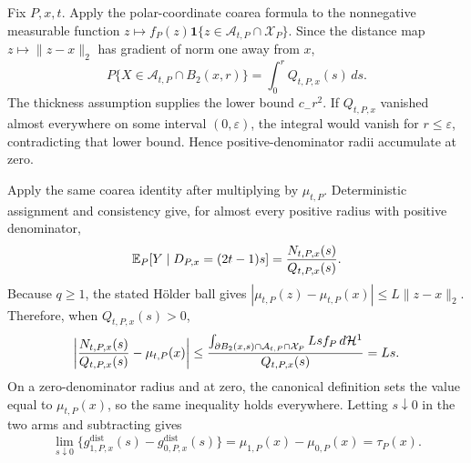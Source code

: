 Fix \(P,x,t\).  Apply the polar-coordinate coarea formula to the nonnegative measurable function
\(z\mapsto f_P(z)\mathbf1\{z\in\mathcal A_{t,P}\cap\mathcal X_P\}\).  Since the distance map \(z\mapsto\|z-x\|_2\) has gradient of norm one away from \(x\),
\[
 P\{X\in\mathcal A_{t,P}\cap B_2(x,r)\}=\int_0^rQ_{t,P,x}(s)\,ds.
\]
The thickness assumption supplies the lower bound \(c_-r^2\).  If \(Q_{t,P,x}\) vanished almost everywhere on some interval \((0,\varepsilon)\), the integral would vanish for \(r\leq\varepsilon\), contradicting that lower bound.  Hence positive-denominator radii accumulate at zero.

Apply the same coarea identity after multiplying by \(\mu_{t,P}\).  Deterministic assignment and consistency give, for almost every positive radius with positive denominator,
\[
 \mathbb E_P[Y\mid D_{P,x}=(2t-1)s]
 ={N_{t,P,x}(s)\over Q_{t,P,x}(s)}.
\]
Because \(q\geq1\), the stated H\"older ball gives \(|\mu_{t,P}(z)-\mu_{t,P}(x)|\leq L\|z-x\|_2\).  Therefore, when \(Q_{t,P,x}(s)>0\),
\[
 \left|{N_{t,P,x}(s)\over Q_{t,P,x}(s)}-\mu_{t,P}(x)\right|
 \leq {\int_{\partial B_2(x,s)\cap\mathcal A_{t,P}\cap\mathcal X_P}Ls f_P\,d\mathcal H^1\over Q_{t,P,x}(s)}=Ls.
\]
On a zero-denominator radius and at zero, the canonical definition sets the value equal to \(\mu_{t,P}(x)\), so the same inequality holds everywhere.  Letting \(s\downarrow0\) in the two arms and subtracting gives
\[
 \lim_{s\downarrow0}\{g^{\mathrm{dist}}_{1,P,x}(s)-g^{\mathrm{dist}}_{0,P,x}(s)\}
 =\mu_{1,P}(x)-\mu_{0,P}(x)=\tau_P(x).
\]